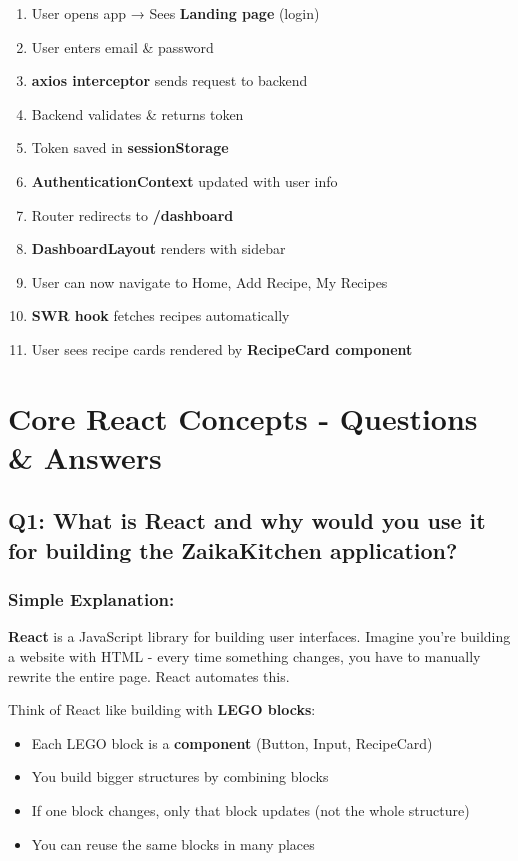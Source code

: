 \documentclass[12pt]{article}
\begin{document}
\begin{enumerate}
    \item User opens app → Sees \textbf{Landing page} (login)
    \item User enters email \& password
    \item \textbf{axios interceptor} sends request to backend
    \item Backend validates \& returns token
    \item Token saved in \textbf{sessionStorage}
    \item \textbf{AuthenticationContext} updated with user info
    \item Router redirects to \textbf{/dashboard}
    \item \textbf{DashboardLayout} renders with sidebar
    \item User can now navigate to Home, Add Recipe, My Recipes
    \item \textbf{SWR hook} fetches recipes automatically
    \item User sees recipe cards rendered by \textbf{RecipeCard component}
\end{enumerate}

\section{Core React Concepts - Questions \& Answers}

\subsection{Q1: What is React and why would you use it for building the ZaikaKitchen application?}

\subsubsection*{Simple Explanation:}

\textbf{React} is a JavaScript library for building user interfaces. Imagine you're building a website with HTML - every time something changes, you have to manually rewrite the entire page. React automates this.

Think of React like building with \textbf{LEGO blocks}:
\begin{itemize}
    \item Each LEGO block is a \textbf{component} (Button, Input, RecipeCard)
    \item You build bigger structures by combining blocks
    \item If one block changes, only that block updates (not the whole structure)
    \item You can reuse the same blocks in many places
\end{itemize}
\end{document}

